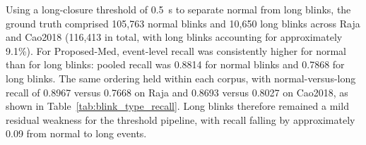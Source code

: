 Using a long-closure threshold of 0.5~s to separate normal from long blinks, the ground truth comprised 105{,}763 normal blinks and 10{,}650 long blinks across Raja and Cao2018 (116{,}413 in total, with long blinks accounting for approximately 9.1\%). For Proposed-Med, event-level recall was consistently higher for normal than for long blinks: pooled recall was 0.8814 for normal blinks and 0.7868 for long blinks. The same ordering held within each corpus, with normal-versus-long recall of 0.8967 versus 0.7668 on Raja and 0.8693 versus 0.8027 on Cao2018, as shown in Table~\ref{tab:blink_type_recall}. Long blinks therefore remained a mild residual weakness for the threshold pipeline, with recall falling by approximately 0.09 from normal to long events.
